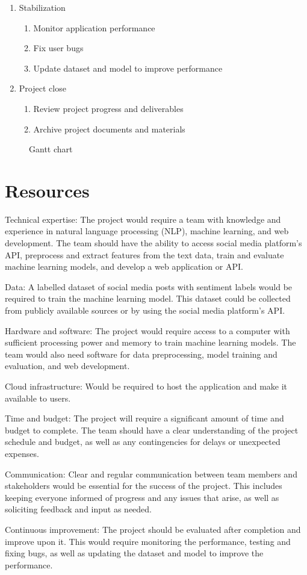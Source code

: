 \documentclass[a4paper,12pt]{article}
\begin{document}
\begin{enumerate}
     \item Stabilization
     \begin{enumerate}
         \item Monitor application performance
         \item Fix user bugs 
         \item Update dataset and model to improve performance
     \end{enumerate}
     \item Project close
     \begin{enumerate}
         \item  Review project progress and deliverables
         \item Archive project documents and materials
     \end{enumerate}
 \end{enumerate}

\begin{figure}[H]
    
  \caption{Gantt chart}
  \label{fig:tikz:gantt}
\end{figure}

\section{Resources}
Technical expertise: The project would require a team with knowledge and experience in natural language processing (NLP), machine learning, and web development. The team should have the ability to access social media platform's API, preprocess and extract features from the text data, train and evaluate machine learning models, and develop a web application or API.

Data: A labelled dataset of social media posts with sentiment labels would be required to train the machine learning model. This dataset could be collected from publicly available sources or by using the social media platform's API.

Hardware and software: The project would require access to a computer with sufficient processing power and memory to train machine learning models. The team would also need software for data preprocessing, model training and evaluation, and web development.

Cloud infrastructure: Would be required to host the application and make it available to users.

Time and budget: The project will require a significant amount of time and budget to complete. The team should have a clear understanding of the project schedule and budget, as well as any contingencies for delays or unexpected expenses.

Communication: Clear and regular communication between team members and stakeholders would be essential for the success of the project. This includes keeping everyone informed of progress and any issues that arise, as well as soliciting feedback and input as needed.

Continuous improvement: The project should be evaluated after completion and improve upon it. This would require monitoring the performance, testing and fixing bugs, as well as updating the dataset and model to improve the performance.
\end{document}
